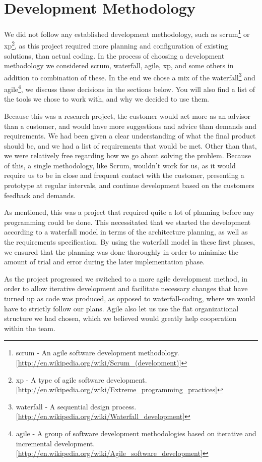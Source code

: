 \section{Development Methodology}\label{Development Methodology} 
    We did not follow any established development methodology, such as \gls{scrum}\footnote{\gls{scrum} - An agile software development methodology. [\url{http://en.wikipedia.org/wiki/Scrum_(development)}]} or \gls{xp}\footnote{\gls{xp} - A type of agile software development. [\url{http://en.wikipedia.org/wiki/Extreme_programming_practices}]}, as this project required more planning and configuration of existing solutions, than actual coding. In the process of choosing a development methodology we considered scrum, waterfall, agile, xp, and some others in addition to combination of these. In the end we chose a mix of the \gls{waterfall}\footnote{\gls{waterfall} - A sequential design process. [\url{http://en.wikipedia.org/wiki/Waterfall_development}]} and \gls{agile}\footnote{\gls{agile} - A group of software development methodologies based on iterative and incremental development. [\url{http://en.wikipedia.org/wiki/Agile_software_development}]}, we discuss these decisions in the sections below. You will also 
find a list of the tools we chose to work with, and why we decided to use them. 
    
    Because this was a research project, the customer would act more as an advisor than a customer, and would have more suggestions and advice than demands and requirements. We had been given a clear understanding of what the final product should be, and we had a list of requirements that would be met. Other than that, we were relatively free regarding how we go about solving the problem. Because of this, a single methodology, like Scrum, wouldn't work for us, as it would require us to be in close and frequent contact with the customer, presenting a prototype at regular intervals, and continue development based on the customers feedback and demands.
    
    As mentioned, this was a project that required quite a lot of planning before any programming could be done. This necessitated that we started the development according to a waterfall model in terms of the architecture planning, as well as the requirements specification. By using the waterfall model in these first phases, we ensured that the planning was done thoroughly in order to minimize the amount of trial and error during the later implementation phase.
    
    As the project progressed we switched to a more agile development method, in order to allow iterative development and facilitate necessary changes that have turned up as code was produced, as opposed to waterfall-coding, where we would have to strictly follow our plans. Agile also let us use the flat organizational structure we had chosen, which we believed would greatly help cooperation within the team.
    
